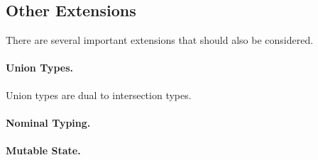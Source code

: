 \subsection{Other Extensions}

There are several important extensions that should also be considered.


\paragraph{Union Types.}

Union types are dual to intersection types.



\paragraph{Nominal Typing.}

\paragraph{Mutable State.}






